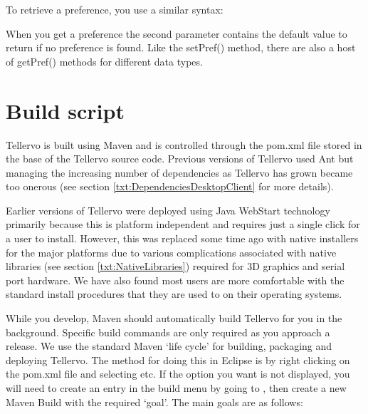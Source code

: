 To retrieve a preference, you use a similar syntax:

When you get a preference the second parameter contains the default value to return if no preference is found.  Like the setPref() method, there are also a host of getPref() methods for different data types.



\section{Build script}
\label{txt:buildScript}
Tellervo is built using Maven and is controlled through the pom.xml file stored in the base of the Tellervo source code.  Previous versions of Tellervo used Ant but managing the increasing number of dependencies as Tellervo has grown became too onerous (see section \ref{txt:DependenciesDesktopClient} for more details). 

Earlier versions of Tellervo were deployed using Java WebStart technology primarily because this is platform independent and requires just a single click for a user to install.  However, this was replaced some time ago with native installers for the major platforms due to various complications associated with native libraries (see section \ref{txt:NativeLibraries}) required for 3D graphics and serial port hardware.  We have also found most users are more comfortable with the standard install procedures that they are used to on their operating systems.

While you develop, Maven should automatically build Tellervo for you in the background.  Specific build commands are only required as you approach a release.  We use the standard Maven `life cycle' for building, packaging and deploying Tellervo.  The method for doing this in Eclipse is by right clicking on the pom.xml file and selecting  etc.  If the option you want is not displayed, you will need to create an entry in the build menu by going to , then create a new Maven Build with the required `goal'.   The main goals are as follows:

